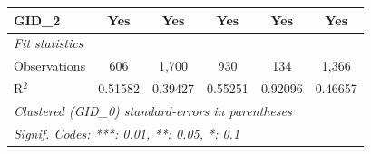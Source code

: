 \begin{table}[htbp]
\begin{tabular}{lccccc}
      GID\_2             & Yes                     & Yes                     & Yes                     & Yes                            & Yes\\  
      \midrule
      \emph{Fit statistics}\\
      Observations       & 606                     & 1,700                   & 930                     & 134                            & 1,366\\  
      R$^2$              & 0.51582                 & 0.39427                 & 0.55251                 & 0.92096                        & 0.46657\\  
      \midrule \midrule
      \multicolumn{6}{l}{\emph{Clustered (GID\_0) standard-errors in parentheses}}\\
      \multicolumn{6}{l}{\emph{Signif. Codes: ***: 0.01, **: 0.05, *: 0.1}}\\
   \end{tabular}
\end{table}



